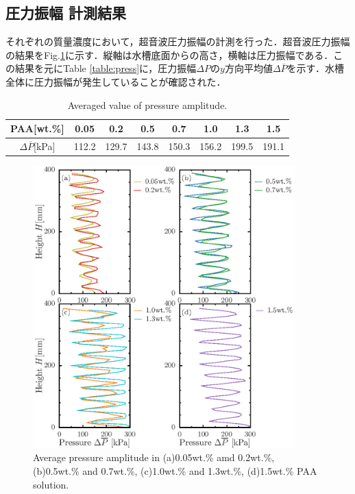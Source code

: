\clearpage

\subsection{圧力振幅 計測結果}

それぞれの質量濃度において，超音波圧力振幅の計測を行った．超音波圧力振幅の結果をFig.\ref{fig:pressure}に示す．縦軸は水槽底面からの高さ，横軸は圧力振幅である．この結果を元にTable \ref{table:press}に，圧力振幅$\Delta{}P$の$y$方向平均値$\Delta\overline{P}$を示す．水槽全体に圧力振幅が発生していることが確認された．

\begin{table}[h]
	\centering
	\caption{Averaged value of pressure amplitude.}
	\label{table:press-A}
	\begin{tabular}{c|c|c|c|c|c|c|c} \hline
		PAA[wt.\%]                & 0.05  & 0.2   & 0.5   & 0.7   & 1.0   & 1.3   & 1.5   \\ \hline \hline
		$\Delta\overline{P}$[kPa] & 112.2 & 129.7 & 143.8 & 150.3 & 156.2 & 199.5 & 191.1 \\ \hline
	\end{tabular}
\end{table}

\begin{figure}[ht]
	\centering
	\includegraphics[width=0.9\textwidth]{3-Physical_Property/press.eps}
	\caption{Average pressure amplitude in (a)0.05wt.\% amd 0.2wt.\%, (b)0.5wt.\% and 0.7wt.\%, (c)1.0wt.\% and 1.3wt.\%, (d)1.5wt.\% PAA solution.}
	\label{fig:pressure}
\end{figure}
